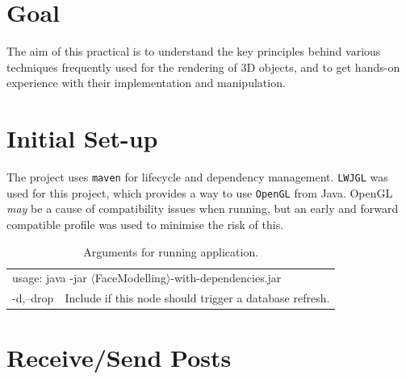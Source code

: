 \documentclass[12pt]{article}
\begin{document}
\begin{titlepage}

\vfill %

\end{titlepage}

\section*{Goal}

The aim of this practical is to understand the key principles behind various techniques
frequently used for the rendering of 3D objects, and to get hands-on experience with their implementation and manipulation.

\setcounter{page}{1} 

\section{Initial Set-up}

The project uses \texttt{maven} for lifecycle and dependency management.
\texttt{LWJGL} was used for this project, which provides a way to use \texttt{OpenGL} from Java. 
OpenGL \textit{may} be a cause of compatibility issues when running, but an early and forward compatible profile was used to minimise the risk of this.

\renewcommand{\arraystretch}{1.5}
\begin{table}[!ht]
\centering
\begin{tabular}{ll}
\multicolumn{2}{l}{usage: java -jar $\langle$FaceModelling$\rangle$-with-dependencies.jar}
\\ 

 -d,--drop           &  Include if this node should trigger a database refresh. \\
\end{tabular}
\caption{Arguments for running application.}
\label{tbl:arguments}
\end{table}


\section{Receive/Send Posts}
\end{document}
